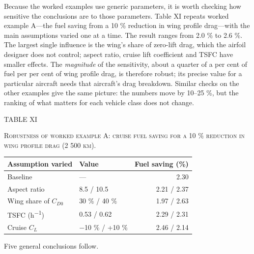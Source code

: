 \documentclass[10pt,a4paper,twocolumn]{article}
\begin{document}
Because the worked examples use generic parameters, it is worth checking
how sensitive the conclusions are to those parameters. Table XI repeats
worked example A---the fuel saving from a 10 \% reduction in wing
profile drag---with the main assumptions varied one at a time. The
result ranges from 2.0 \% to 2.6 \%. The largest single influence is the
wing's share of zero-lift drag, which the airfoil designer does not
control; aspect ratio, cruise lift coefficient and TSFC have smaller
effects. The \emph{magnitude} of the sensitivity, about a quarter of a
per cent of fuel per per cent of wing profile drag, is therefore robust;
its precise value for a particular aircraft needs that aircraft's drag
breakdown. Similar checks on the other examples give the same picture:
the numbers move by 10--25 \%, but the ranking of what matters for each
vehicle class does not change.

\begin{table}[!t]
\centering
{\footnotesize TABLE XI\par\textsc{Robustness of worked example A: cruise fuel saving for a 10 \%
reduction in wing profile drag (2 500 km).}\par}\vspace{4pt}
{\footnotesize\setlength{\tabcolsep}{4pt}\renewcommand{\arraystretch}{1.12}
\begin{tabularx}{\columnwidth}{>{\raggedright\arraybackslash}Xlr}
\toprule
\textbf{Assumption varied} & \textbf{Value} & \textbf{Fuel saving (\%)} \\
\midrule
Baseline & --- & 2.30 \\
Aspect ratio & 8.5 / 10.5 & 2.21 / 2.37 \\
Wing share of \(C_{D0}\) & 30 \% / 40 \% & 1.97 / 2.63 \\
TSFC (h\textsuperscript{−1}) & 0.53 / 0.62 & 2.29 / 2.31 \\
Cruise \(C_L\) & −10 \% / +10 \% & 2.46 / 2.14 \\
\bottomrule
\end{tabularx}
}
\end{table}

Five general conclusions follow.
\end{document}
